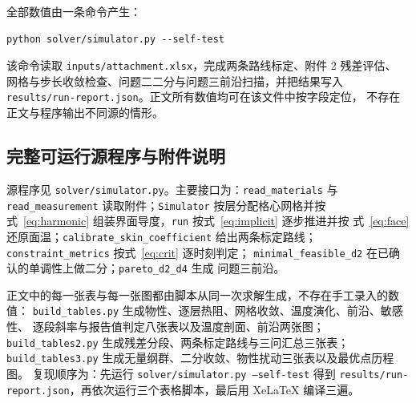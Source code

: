 \documentclass[withoutpreface,bwprint]{cumcmthesis}
\begin{document}
全部数值由一条命令产生：

\begin{verbatim}
python solver/simulator.py --self-test
\end{verbatim}

该命令读取 \texttt{inputs/attachment.xlsx}，完成两条路线标定、附件 2 残差评估、
网格与步长收敛检查、问题二二分与问题三前沿扫描，并把结果写入
\texttt{results/run-report.json}。正文所有数值均可在该文件中按字段定位，
不存在正文与程序输出不同源的情形。

\subsection{完整可运行源程序与附件说明}

源程序见 \texttt{solver/simulator.py}。主要接口为：\texttt{read\_materials} 与
\texttt{read\_measurement} 读取附件；\texttt{Simulator} 按层分配格心网格并按
式~\eqref{eq:harmonic} 组装界面导度，\texttt{run} 按式~\eqref{eq:implicit} 逐步推进并按
式~\eqref{eq:face} 还原面温；\texttt{calibrate\_skin\_coefficient} 给出两条标定路线；
\texttt{constraint\_metrics} 按式~\eqref{eq:crit} 逐时刻判定；
\texttt{minimal\_feasible\_d2} 在已确认的单调性上做二分；\texttt{pareto\_d2\_d4} 生成
问题三前沿。

正文中的每一张表与每一张图都由脚本从同一次求解生成，不存在手工录入的数值：
\texttt{build\_tables.py} 生成物性、逐层热阻、网格收敛、温度演化、前沿、敏感性、
逐段斜率与报告值判定八张表以及温度剖面、前沿两张图；
\texttt{build\_tables2.py} 生成残差分段、两条标定路线与三问汇总三张表；
\texttt{build\_tables3.py} 生成无量纲群、二分收敛、物性扰动三张表以及最优点历程图。
复现顺序为：先运行 \texttt{solver/simulator.py --self-test} 得到
\texttt{results/run-report.json}，再依次运行三个表格脚本，最后用 XeLaTeX 编译三遍。
\end{document}
